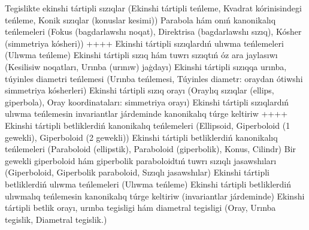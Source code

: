 Tegislikte ekinshi tártipli sızıqlar (Ekinshi tártipli teńleme, Kvadrat kórinisindegi teńleme, Konik sızıqlar (konuslar kesimi))
Parabola hám onıń kanonikalıq teńlemeleri (Fokus (bagdarlawshı noqat), Direktrisa (bagdarlawshı sızıq), Kósher (simmetriya kósheri))
++++
Ekinshi tártipli sızıqlardıń ulıwma teńlemeleri (Ulıwma teńleme)
Ekinshi tártipli sızıq hám tuwrı sızıqtıń óz ara jaylasıwı (Kesilisiw noqatları, Urınba (urınıw) jaģdayı)
Ekinshi tártipli sızıqqa urınba, túyinles diametri teńlemesi (Urınba teńlemesi, Túyinles diametr: oraydan ótiwshi simmetriya kósherleri)
Ekinshi tártipli sızıq orayı (Oraylıq sızıqlar (ellips, giperbola), Oray koordinataları: simmetriya orayı)
Ekinshi tártipli sızıqlardıń ulıwma teńlemesin invariantlar járdeminde kanonikalıq túrge keltiriw
++++
Ekinshi tártipli betliklerdiń kanonikalıq teńlemeleri (Ellipsoid, Giperboloid (1 gewekli), Giperboloid (2 gewekli))
Ekinshi tártipli betliklerdiń kanonikalıq teńlemeleri (Paraboloid (ellipstik), Paraboloid (giperbolik), Konus, Cilindr)
Bir gewekli giperboloid hám giperbolik paraboloidtıń tuwrı sızıqlı jasawshıları (Giperboloid, Giperbolik paraboloid, Sızıqlı jasawshılar)
Ekinshi tártipli betliklerdiń ulıwma teńlemeleri (Ulıwma teńleme)
Ekinshi tártipli betliklerdiń ulıwmalıq teńlemesin kanonikalıq túrge keltiriw (invariantlar járdeminde)
Ekinshi tártipli betlik orayı, urınba tegisligi hám diametral tegisligi (Oray, Urınba tegislik, Diametral tegislik.)